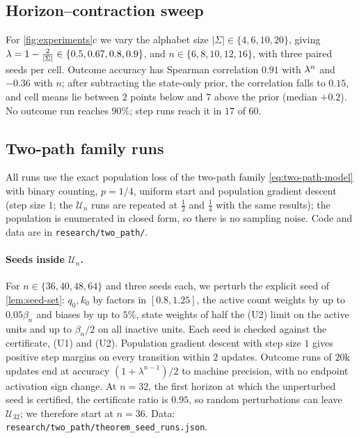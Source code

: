 \subsection{Horizon--contraction sweep}
\label{app:exp-lambda}
For \cref{fig:experiments}c we vary the alphabet size $|\Sigma|\in\{4,6,10,20\}$, giving $\lambda=1-\frac{2}{|\Sigma|}\in\{0.5,0.67,0.8,0.9\}$,
and $n\in\{6,8,10,12,16\}$, with three paired seeds per cell. Outcome accuracy has Spearman correlation $0.91$ with $\lambda^n$ and $-0.36$
with $n$; after subtracting the state-only prior, the correlation falls to $0.15$, and cell means lie between $2$ points below and $7$ above
the prior (median $+0.2$). No outcome run reaches $90\%$; step runs reach it in $17$ of $60$.

\subsection{Two-path family runs}
\label{app:two-path-experiments}
All runs use the exact population loss of the two-path family \cref{eq:two-path-model} with binary counting, $p=1/4$,
uniform start and population gradient descent (step size $1$; the $\mathcal U_n$ runs are repeated at $\frac12$ and $\frac14$ with the same results); the population is enumerated in closed form, so there is no sampling
noise. Code and data are in \nolinkurl{research/two_path/}.

\paragraph{Seeds inside $\mathcal U_n$.} For $n\in\{36,40,48,64\}$ and three seeds each, we perturb the explicit seed of
\cref{lem:seed-set}: $q_0,k_0$ by factors in $[0.8,1.25]$, the active count weights by up to $0.05\beta_n$ and biases by
up to $5\%$, state weights of half the (U2) limit on the active units and up to $\beta_n/2$ on all inactive units.
Each seed is checked against the certificate, (U1) and (U2). Population gradient descent with step size $1$ gives
positive step margins on every transition within $2$ updates. Outcome runs of $20$k updates end at accuracy
$(1+\lambda^{n-1})/2$ to machine precision, with no endpoint activation sign change. At $n=32$, the first horizon at
which the unperturbed seed is certified, the certificate ratio is $0.95$, so random perturbations can leave $\mathcal U_{32}$;
we therefore start at $n=36$. Data: \nolinkurl{research/two_path/theorem_seed_runs.json}.

